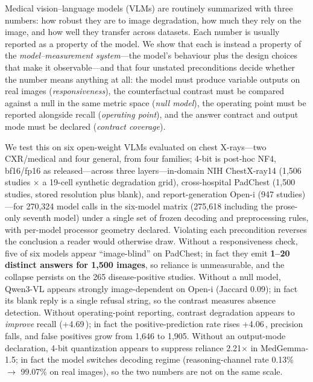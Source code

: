Medical vision--language models (VLMs) are routinely summarized with three numbers: how robust they are to image degradation, how much they rely on the image, and how well they transfer across datasets. Each number is usually reported as a property of the model. We show that each is instead a property of the \emph{model--measurement system}---the model's behaviour plus the design choices that make it observable---and that four unstated preconditions decide whether the number means anything at all: the model must produce variable outputs on real images (\emph{responsiveness}), the counterfactual contrast must be compared against a null in the same metric space (\emph{null model}), the operating point must be reported alongside recall (\emph{operating point}), and the answer contract and output mode must be declared (\emph{contract coverage}).

We test this on six open-weight VLMs evaluated on chest X-rays---two CXR/medical and four general, from four families; 4-bit is post-hoc NF4, bf16/fp16 as released---across three layers---in-domain NIH ChestX-ray14 (1,506 studies $\times$ a 19-cell synthetic degradation grid), cross-hospital PadChest (1,500 studies, stored resolution plus blank), and report-generation Open-i (947 studies)---for 270,324 model calls in the six-model matrix (275,618 including the prose-only seventh model) under a single set of frozen decoding and preprocessing rules, with per-model processor geometry declared. Violating each precondition reverses the conclusion a reader would otherwise draw. Without a responsiveness check, five of six models appear ``image-blind'' on PadChest; in fact they emit \textbf{1--20 distinct answers for 1,500 images}, so reliance is unmeasurable, and the collapse persists on the 265 disease-positive studies. Without a null model, Qwen3-VL appears strongly image-dependent on Open-i (Jaccard 0.09); in fact its blank reply is a single refusal string, so the contrast measures absence detection. Without operating-point reporting, contrast degradation appears to \emph{improve} recall (+4.69\,\pp{}); in fact the positive-prediction rate rises +4.06\,\pp{}, precision falls, and false positives grow from 1,646 to 1,905. Without an output-mode declaration, 4-bit quantization appears to suppress reliance 2.21$\times$ in MedGemma-1.5; in fact the model switches decoding regime (reasoning-channel rate 0.13\% $\rightarrow$ 99.07\% on real images), so the two numbers are not on the same scale.

